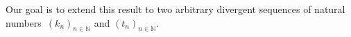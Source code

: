 \documentclass[11pt,a4paper]{article}
\theoremstyle{definition}
\newtheorem{lemma}[theorem]{Lemma}
\newcommand{\N}{\mathbb N}
\newcommand{\fb}{\textnormal{FB}}
\newcommand{\fp}{\textnormal{FP}}
\begin{document}
Our goal is to extend this result to two arbitrary divergent sequences of natural numbers~$(k_n)_{n\in\N}$ and $(t_n)_{n\in\N}$.

\end{document}
